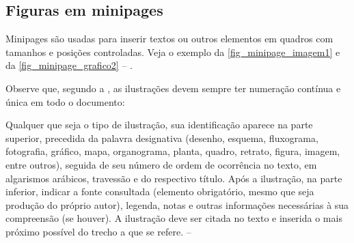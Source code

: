 
\subsection{Figuras em minipages}

Minipages são usadas para inserir textos ou outros elementos em quadros
com tamanhos e posições controladas. Veja o exemplo da
\autoref{fig_minipage_imagem1} e da \autoref{fig_minipage_grafico2} -- \showfont.




Observe que, segundo a \textcite[seções 4.2.1.10 e 5.8]{NBR14724:2011}, as
ilustrações devem sempre ter numeração contínua e única em todo o documento:

\begin{citacao}
    Qualquer que seja o tipo de ilustração, sua identificação aparece na parte
    superior, precedida da palavra designativa (desenho, esquema, fluxograma,
    fotografia, gráfico, mapa, organograma, planta, quadro, retrato, figura,
    imagem, entre outros), seguida de seu número de ordem de ocorrência no texto,
    em algarismos arábicos, travessão e do respectivo título. Após a ilustração, na
    parte inferior, indicar a fonte consultada (elemento obrigatório, mesmo que
    seja produção do próprio autor), legenda, notas e outras informações
    necessárias à sua compreensão (se houver). A ilustração deve ser citada no
    texto e inserida o mais próximo possível do trecho a que se
    refere. \cite[seções 5.8]{NBR14724:2011} -- \showfont
\end{citacao}

